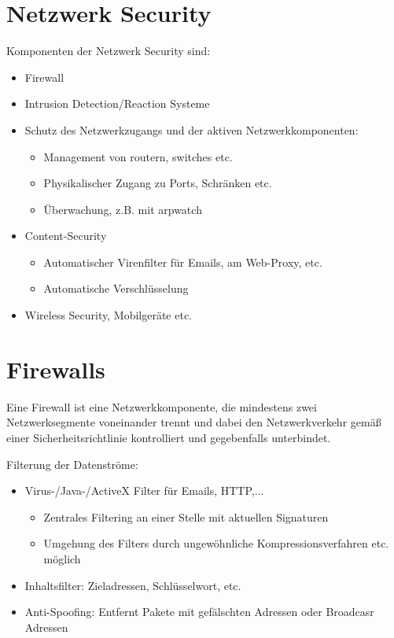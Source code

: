 \section{Netzwerk Security}
Komponenten der Netzwerk Security sind:
\begin{itemize}
    \item Firewall
    \item Intrusion Detection/Reaction Systeme
    \item Schutz des Netzwerkzugangs und der aktiven Netzwerkkomponenten:
        \begin{itemize}
            \item Management von routern, switches etc.
            \item Physikalischer Zugang zu Ports, Schränken etc.
            \item Überwachung, z.B. mit arpwatch
        \end{itemize}
    \item Content-Security
        \begin{itemize}
            \item Automatischer Virenfilter für Emails, am Web-Proxy, etc.
            \item Automatische Verschlüsselung
        \end{itemize}
    \item Wireless Security, Mobilgeräte etc.
\end{itemize}

\section{Firewalls}
Eine Firewall ist eine Netzwerkkomponente, die mindestens zwei Netzwerksegmente voneinander trennt und dabei den Netzwerkverkehr gemäß einer Sicherheitsrichtlinie kontrolliert und gegebenfalls unterbindet.

\vspace{.3cm}

Filterung der Datenströme:
\begin{itemize}
    \item Virus-/Java-/ActiveX Filter für Emails, HTTP,...
        \begin{itemize}
            \item Zentrales Filtering an einer Stelle mit aktuellen Signaturen
            \item Umgehung des Filters durch ungewöhnliche Kompressionsverfahren etc. möglich
        \end{itemize}
    \item Inhaltsfilter: Zieladressen, Schlüsselwort, etc.
    \item Anti-Spoofing: Entfernt Pakete mit gefälschten Adressen oder Broadcasr Adressen
\end{itemize}

